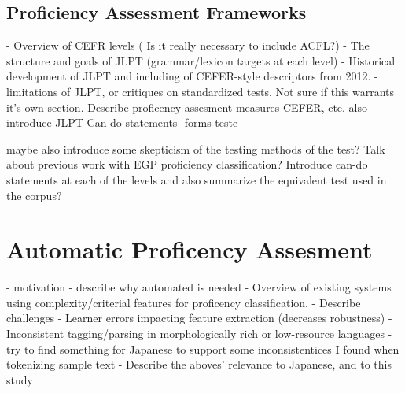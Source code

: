 \subsection{Proficiency Assessment Frameworks}
- Overview of CEFR levels ( Is it really necessary to include ACFL?)
- The structure and goals of JLPT (grammar/lexicon targets at each level)
- Historical development of JLPT and including of CEFER-style descriptors from 2012.
- limitations of JLPT, or critiques on standardized tests.
Not sure if this warrants it's own section. Describe proficency assesment measures CEFER, etc. also introduce JLPT
Can-do statements- forms teste


maybe also introduce some skepticism of the testing methods of the test?
Talk about previous work with EGP proficiency classification?
Introduce can-do statements at each of the levels and also summarize the equivalent test used in the corpus?


\section{Automatic Proficency Assesment}
- motivation - describe why automated is needed
- Overview of existing systems using complexity/criterial features for proficency classification.
- Describe challenges
    - Learner errors impacting feature extraction (decreases robustness)
    -Inconsistent tagging/parsing in morphologically rich or low-resource languages
        -try to find something for Japanese to support some inconsistentices I found when tokenizing sample text
- Describe the aboves' relevance to Japanese, and to this study



